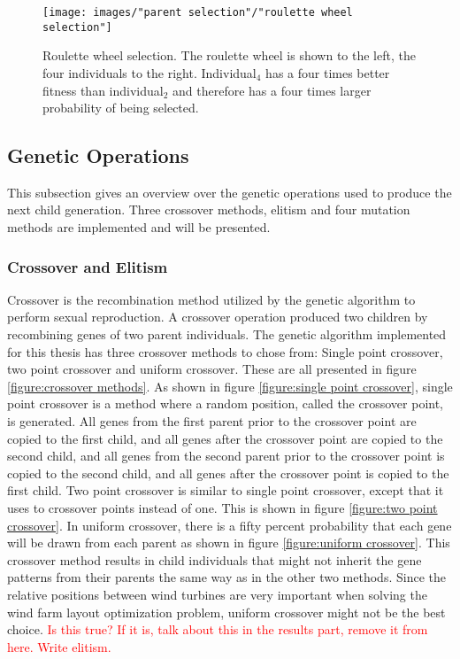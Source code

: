 \begin{figure}[h!]
\begin{center}
\texttt{[image: images/"parent selection"/"roulette wheel selection"]}
\caption{Roulette wheel selection. The roulette wheel is shown to the left, the four individuals to the right. Individual$_4$ has a four times better fitness than individual$_2$ and therefore has a four times larger probability of being selected.}
\label{figure:roulette wheel selection}
\end{center}
\end{figure}


\subsection{Genetic Operations}\label{subsection:genetic operations}
This subsection gives an overview over the genetic operations used to produce the next child generation. Three crossover methods, elitism and four mutation methods are implemented and will be presented. 


\subsubsection{Crossover and Elitism}
Crossover is the recombination method utilized by the genetic algorithm to perform sexual reproduction. A crossover operation produced two children by recombining genes of two parent individuals. The genetic algorithm implemented for this thesis has three crossover methods to chose from: Single point crossover, two point crossover and uniform crossover. These are all presented in figure \ref{figure:crossover methods}. As shown in figure \ref{figure:single point crossover}, single point crossover is a method where a random position, called the crossover point, is generated. All genes from the first parent prior to the crossover point are copied to the first child, and all genes after the crossover point are copied to the second child, and all genes from the second parent prior to the crossover point is copied to the second child, and all genes after the crossover point is copied to the first child. Two point crossover is similar to single point crossover, except that it uses to crossover points instead of one. This is shown in figure \ref{figure:two point crossover}. In uniform crossover, there is a fifty percent probability that each gene will be drawn from each parent as shown in figure \ref{figure:uniform crossover}. This crossover method results in child individuals that might not inherit the gene patterns from their parents the same way as in the other two methods. Since the relative positions between wind turbines are very important when solving the wind farm layout optimization problem, uniform crossover might not be the best choice. \textcolor{red}{Is this true? If it is, talk about this in the results part, remove it from here.} \textcolor{red}{Write elitism.}


